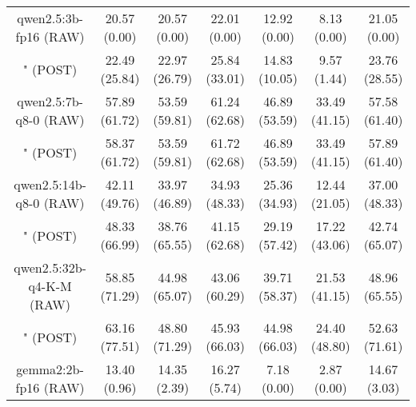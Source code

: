 \begin{table}[]
{\begin{tabular}{ccccccc}
        \multicolumn{1}{c|}{qwen2.5:3b-fp16 (RAW)} & 20.57 (0.00) & 20.57 (0.00) & \multicolumn{1}{c|}{22.01 (0.00)} & 12.92 (0.00) & \multicolumn{1}{c|}{8.13 (0.00)} & 21.05 (0.00) \\
        
        

        \multicolumn{1}{c|}{" (POST)} & 22.49 (25.84) & 22.97 (26.79) & \multicolumn{1}{c|}{25.84 (33.01)} & 14.83 (10.05) & \multicolumn{1}{c|}{9.57 (1.44)} & 23.76 (28.55) \\
        \cline{1-7}
        

        \multicolumn{1}{c|}{qwen2.5:7b-q8-0 (RAW)} & 57.89 (61.72) & 53.59 (59.81) & \multicolumn{1}{c|}{61.24 (62.68)} & 46.89 (53.59) & \multicolumn{1}{c|}{33.49 (41.15)} & 57.58 (61.40) \\
        
        

        \multicolumn{1}{c|}{" (POST)} & 58.37 (61.72) & 53.59 (59.81) & \multicolumn{1}{c|}{61.72 (62.68)} & 46.89 (53.59) & \multicolumn{1}{c|}{33.49 (41.15)} & 57.89 (61.40) \\
        \cline{1-7}
        

        \multicolumn{1}{c|}{qwen2.5:14b-q8-0 (RAW)} & 42.11 (49.76) & 33.97 (46.89) & \multicolumn{1}{c|}{34.93 (48.33)} & 25.36 (34.93) & \multicolumn{1}{c|}{12.44 (21.05)} & 37.00 (48.33) \\
        
        

        \multicolumn{1}{c|}{" (POST)} & 48.33 (66.99) & 38.76 (65.55) & \multicolumn{1}{c|}{41.15 (62.68)} & 29.19 (57.42) & \multicolumn{1}{c|}{17.22 (43.06)} & 42.74 (65.07) \\
        \cline{1-7}
        

        \multicolumn{1}{c|}{qwen2.5:32b-q4-K-M (RAW)} & 58.85 (71.29) & 44.98 (65.07) & \multicolumn{1}{c|}{43.06 (60.29)} & 39.71 (58.37) & \multicolumn{1}{c|}{21.53 (41.15)} & 48.96 (65.55) \\
        
        

        \multicolumn{1}{c|}{" (POST)} & 63.16 (77.51) & 48.80 (71.29) & \multicolumn{1}{c|}{45.93 (66.03)} & 44.98 (66.03) & \multicolumn{1}{c|}{24.40 (48.80)} & 52.63 (71.61) \\
        \cline{1-7}
        

        \multicolumn{1}{c|}{gemma2:2b-fp16 (RAW)} & 13.40 (0.96) & 14.35 (2.39) & \multicolumn{1}{c|}{16.27 (5.74)} & 7.18 (0.00) & \multicolumn{1}{c|}{2.87 (0.00)} & 14.67 (3.03) \\
        

\end{tabular}}
\end{table}

